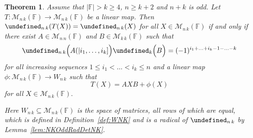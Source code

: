 \documentclass{elsarticle}
\def\F{{\mathbb F}}
\def\M{{\mathcal M}}
\let\det\undefined
\DeclareMathOperator{\det}{det}
\theoremstyle{plain}
\newtheorem{theorem}{Theorem}[section]
\theoremstyle{definition}
\numberwithin{equation}{section}
\begin{document}
\begin{theorem}\label{thm:MainTheoremCullisNKOdd}Assume that $|\F| > k \ge 4$, $n \ge k + 2$ and $n + k$ is odd. Let $T\colon \M_{n\,k} (\F) \to \M_{n\,k} (\F)$ be a linear map. Then $\det_{n\, k} (T(X)) = \det_{n\,k}(X)$ for all $X \in \M_{n\,k} (\F)$ if and only if  there exist $A \in \M_{n\, n}(\F)$ and $B \in \M_{k\, k}(\F)$ such that
\begin{equation}\label{thm:MainTheoremCullisNKOdd:eqq}
\det_{n\,k} \Bigl(A(|i_1,\ldots, i_k]\Bigr) \det_k \Bigl(B\Bigr) = (-1)^{i_1 + \ldots + i_k - 1 - \ldots - k}
\end{equation}
for all increasing sequences $1 \le i_1 < \ldots < i_k \le n $ and a linear map\linebreak $\phi\colon \M_{n\,k}(\F) \to W_{n\,k}$ such that
\begin{equation}\label{thm:MainTheoremCullisNKOdd:eq}
T(X) = AXB + \phi(X)
\end{equation}
for all $X \in \M_{n\,k} (\F).$

Here $W_{n\,k} \subseteq \M_{n\,k}(\F)$ is the space of matrices, all rows of which are equal, which is defined in Definition~\ref{def:WNK} and  is a radical of $\det_{n\,k}$ by Lemma~\ref{lem:NKOddRadDetNK}.
\end{theorem}
\end{document}
